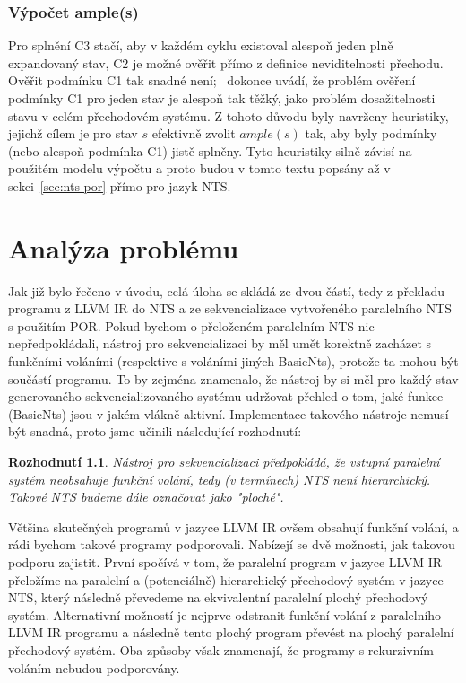 \documentclass[12pt]{fithesis2}
\newtheorem{decision}  {Rozhodnutí}
\begin{document}
\subsection{Výpočet ample(s)}
\label{subsec:por-compute-ample}
Pro splnění C3 stačí, aby v každém cyklu existoval alespoň jeden plně expandovaný stav, C2 je možné ověřit přímo z definice neviditelnosti přechodu. Ověřit podmínku C1 tak snadné není; \cite{CLARKE}~dokonce uvádí, že problém ověření podmínky C1 pro jeden stav je alespoň tak těžký, jako problém dosažitelnosti stavu v celém přechodovém systému. Z tohoto důvodu byly navrženy heuristiky, jejichž cílem je pro stav $s$ efektivně zvolit $ample(s)$ tak, aby byly podmínky (nebo alespoň podmínka C1) jistě splněny. Tyto heuristiky silně závisí na použitém modelu výpočtu a proto budou v tomto textu popsány až v sekci~\ref{sec:nts-por} přímo pro jazyk NTS.


\chapter{Analýza problému}
\label{sec:analysis}
Jak již bylo řečeno v úvodu, celá úloha se skládá ze dvou částí, tedy z překladu programu z LLVM IR do NTS a  ze sekvencializace vytvořeného paralelního NTS s použitím POR. Pokud bychom o přeloženém paralelním NTS nic nepředpokládali, nástroj pro sekvencializaci by měl umět korektně zacházet s funkčními voláními (respektive s voláními jiných BasicNts), protože ta mohou být součástí programu. To by zejména znamenalo, že nástroj by si měl pro každý stav generovaného sekvencializovaného systému udržovat přehled o tom, jaké funkce (BasicNts) jsou v jakém vlákně aktivní. Implementace takového nástroje nemusí být snadná, proto jsme učinili následující rozhodnutí:

\begin{decision}\label{decision:sequentialize-flat-llvm}
Nástroj pro sekvencializaci předpokládá, že vstupní paralelní systém neobsahuje funkční volání, tedy (v termínech) NTS není hierarchický. Takové NTS budeme dále označovat jako "ploché".
\end{decision}

Většina skutečných programů v jazyce LLVM IR ovšem obsahují funkční volání, a rádi bychom takové programy podporovali. Nabízejí se dvě možnosti, jak takovou podporu zajistit. První spočívá v tom, že paralelní program v jazyce LLVM IR přeložíme na paralelní a (potenciálně) hierarchický přechodový systém v jazyce NTS, který následně převedeme na ekvivalentní paralelní plochý přechodový systém. Alternativní možností je nejprve odstranit funkční volání z paralelního LLVM IR programu a následně tento plochý program převést na plochý paralelní přechodový systém. Oba způsoby však znamenají, že programy s rekurzivním voláním nebudou podporovány.
\end{document}
